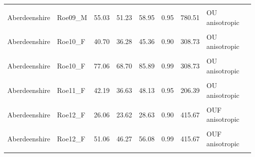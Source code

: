 \documentclass[10pt,a4paper]{article}
\begin{document}
\begin{longtable}[t]{llrrrrrl}
\cellcolor{gray!10}{Aberdeenshire} & \cellcolor{gray!10}{Roe09\_M} & \cellcolor{gray!10}{40.99} & \cellcolor{gray!10}{38.16} & \cellcolor{gray!10}{43.91} & \cellcolor{gray!10}{0.90} & \cellcolor{gray!10}{780.51} & \cellcolor{gray!10}{OU anisotropic}\\
\addlinespace
Aberdeenshire & Roe09\_M & 55.03 & 51.23 & 58.95 & 0.95 & 780.51 & OU anisotropic\\
\cellcolor{gray!10}{Aberdeenshire} & \cellcolor{gray!10}{Roe09\_M} & \cellcolor{gray!10}{84.50} & \cellcolor{gray!10}{78.68} & \cellcolor{gray!10}{90.53} & \cellcolor{gray!10}{0.99} & \cellcolor{gray!10}{780.51} & \cellcolor{gray!10}{OU anisotropic}\\
Aberdeenshire & Roe10\_F & 40.70 & 36.28 & 45.36 & 0.90 & 308.73 & OU anisotropic\\
\cellcolor{gray!10}{Aberdeenshire} & \cellcolor{gray!10}{Roe10\_F} & \cellcolor{gray!10}{53.32} & \cellcolor{gray!10}{47.54} & \cellcolor{gray!10}{59.43} & \cellcolor{gray!10}{0.95} & \cellcolor{gray!10}{308.73} & \cellcolor{gray!10}{OU anisotropic}\\
Aberdeenshire & Roe10\_F & 77.06 & 68.70 & 85.89 & 0.99 & 308.73 & OU anisotropic\\
\addlinespace
\cellcolor{gray!10}{Aberdeenshire} & \cellcolor{gray!10}{Roe11\_F} & \cellcolor{gray!10}{35.06} & \cellcolor{gray!10}{30.44} & \cellcolor{gray!10}{40.00} & \cellcolor{gray!10}{0.90} & \cellcolor{gray!10}{206.39} & \cellcolor{gray!10}{OU anisotropic}\\
Aberdeenshire & Roe11\_F & 42.19 & 36.63 & 48.13 & 0.95 & 206.39 & OU anisotropic\\
\cellcolor{gray!10}{Aberdeenshire} & \cellcolor{gray!10}{Roe11\_F} & \cellcolor{gray!10}{58.53} & \cellcolor{gray!10}{50.82} & \cellcolor{gray!10}{66.78} & \cellcolor{gray!10}{0.99} & \cellcolor{gray!10}{206.39} & \cellcolor{gray!10}{OU anisotropic}\\
Aberdeenshire & Roe12\_F & 26.06 & 23.62 & 28.63 & 0.90 & 415.67 & OUF anisotropic\\
\cellcolor{gray!10}{Aberdeenshire} & \cellcolor{gray!10}{Roe12\_F} & \cellcolor{gray!10}{33.88} & \cellcolor{gray!10}{30.70} & \cellcolor{gray!10}{37.21} & \cellcolor{gray!10}{0.95} & \cellcolor{gray!10}{415.67} & \cellcolor{gray!10}{OUF anisotropic}\\
\addlinespace
Aberdeenshire & Roe12\_F & 51.06 & 46.27 & 56.08 & 0.99 & 415.67 & OUF anisotropic\\
\cellcolor{gray!10}{Aberdeenshire} & \cellcolor{gray!10}{Roe13\_F} & \cellcolor{gray!10}{49.35} & \cellcolor{gray!10}{46.22} & \cellcolor{gray!10}{52.58} & \cellcolor{gray!10}{0.90} & \cellcolor{gray!10}{926.67} & \cellcolor{gray!10}{OU anisotropic}\\

\end{longtable}
\end{document}

